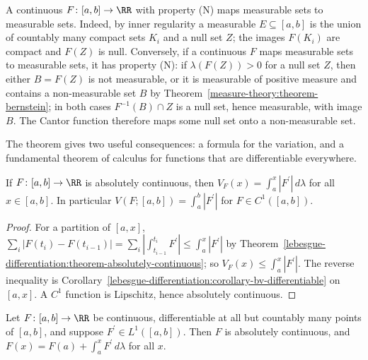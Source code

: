 \begin{remark}\label{lebesgue-differentiation:remark-luzin-measurable}
A continuous $F \colon [a, b] \to \RR$ with property (N) maps measurable sets to measurable sets. Indeed, by inner regularity a measurable $E \subseteq [a, b]$ is the union of countably many compact sets $K_i$ and
a null set $Z$; the images $F(K_i)$ are compact and $F(Z)$ is null. Conversely, if a continuous $F$ maps measurable sets to measurable sets, it has property (N): if $\lambda(F(Z)) > 0$ for a null set $Z$, then
either $B = F(Z)$ is not measurable, or it is measurable of positive measure and contains a non-measurable set $B$ by Theorem~\ref{measure-theory:theorem-bernstein}; in both cases
$F^{-1}(B) \cap Z$ is a null set, hence measurable, with image $B$. The Cantor
function therefore maps some null set onto a non-measurable set.
\end{remark}

The theorem gives two useful consequences: a formula for the variation, and a fundamental theorem of calculus for functions that are differentiable everywhere.

\begin{corollary}\label{lebesgue-differentiation:corollary-variation-integral}
If $F \colon [a, b] \to \RR$ is absolutely continuous, then $V_F(x) = \int_a^x|F^{\prime}|\,d\lambda$ for all $x \in [a, b]$. In particular $V(F; [a, b]) = \int_a^b|F^{\prime}|$ for $F \in C^1([a, b])$.
\end{corollary}

\begin{proof}
For a partition of $[a, x]$, $\sum_i|F(t_i) - F(t_{i-1})| = \sum_i|\int_{t_{i-1}}^{t_i}F^{\prime}| \leq \int_a^x|F^{\prime}|$ by Theorem~\ref{lebesgue-differentiation:theorem-absolutely-continuous}; so
$V_F(x) \leq \int_a^x|F^{\prime}|$. The reverse inequality is Corollary~\ref{lebesgue-differentiation:corollary-bv-differentiable} on $[a, x]$. A $C^1$ function is Lipschitz, hence absolutely continuous.
\end{proof}

\begin{corollary}\label{lebesgue-differentiation:corollary-everywhere-differentiable}
Let $F \colon [a, b] \to \RR$ be continuous, differentiable at all but countably many points of $[a, b]$, and suppose $F^{\prime} \in L^1([a, b])$. Then $F$ is absolutely continuous, and
$F(x) = F(a) + \int_a^xF^{\prime}\,d\lambda$ for all $x$.
\end{corollary}

